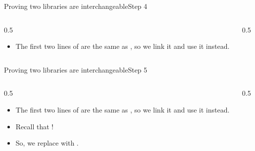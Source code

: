\ifdefined\PRESENTATION\else\PassOptionsToClass{handout}{beamer}\fi\documentclass[aspectratio=169, lualatex]{beamer}
\begin{document}
\begin{frame}{Proving two libraries are interchangeable}{Step 4}
	\begin{columns}[c]
		\begin{column}{0.5\textwidth}
			\begin{itemize}
				\item The first two lines of  are the same as , so we link it and use it instead.
			\end{itemize}
		\end{column}
		\begin{column}{0.5\textwidth}
			\begin{center}
			\end{center}
		\end{column}
	\end{columns}
\end{frame}

\begin{frame}{Proving two libraries are interchangeable}{Step 5}
	\begin{columns}[c]
		\begin{column}{0.5\textwidth}
			\begin{itemize}
				\item The first two lines of  are the same as , so we link it and use it instead.
				\item Recall that  \interchangeable{} !
				\item So, we replace  with .
			\end{itemize}
		\end{column}
		\begin{column}{0.5\textwidth}
			\begin{center}
			\end{center}
		\end{column}
	\end{columns}
\end{frame}
\end{document}

